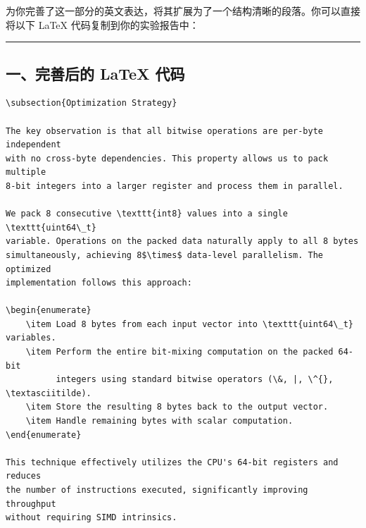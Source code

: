 \documentclass[11pt, a4paper]{article}
\begin{document}
\begin{aibox}
为你完善了这一部分的英文表达，将其扩展为了一个结构清晰的段落。你可以直接将以下 LaTeX 代码复制到你的实验报告中：

\begin{center}\rule{\textwidth}{0.4pt}\end{center}

\subsection*{一、完善后的 LaTeX 代码}

\begin{tcolorbox}[colback=white,colframe=gray!50!white,boxrule=0.5pt,arc=2pt,left=5pt,right=5pt,top=5pt,bottom=5pt]
\begin{verbatim}
\subsection{Optimization Strategy}

The key observation is that all bitwise operations are per-byte independent 
with no cross-byte dependencies. This property allows us to pack multiple 
8-bit integers into a larger register and process them in parallel.

We pack 8 consecutive \texttt{int8} values into a single \texttt{uint64\_t} 
variable. Operations on the packed data naturally apply to all 8 bytes 
simultaneously, achieving 8$\times$ data-level parallelism. The optimized 
implementation follows this approach:

\begin{enumerate}
    \item Load 8 bytes from each input vector into \texttt{uint64\_t} variables.
    \item Perform the entire bit-mixing computation on the packed 64-bit 
          integers using standard bitwise operators (\&, |, \^{}, \textasciitilde).
    \item Store the resulting 8 bytes back to the output vector.
    \item Handle remaining bytes with scalar computation.
\end{enumerate}

This technique effectively utilizes the CPU's 64-bit registers and reduces 
the number of instructions executed, significantly improving throughput 
without requiring SIMD intrinsics.
\end{verbatim}
\end{tcolorbox}


\end{aibox}
\end{document}
